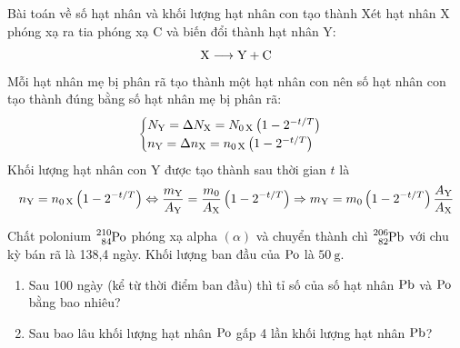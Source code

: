\begin{dang}{Bài toán về số hạt nhân và khối lượng hạt nhân con tạo thành}
		Xét hạt nhân X phóng xạ ra tia phóng xạ C và biến đổi thành hạt nhân Y:
		\begin{equation}
			\ce{X}\longrightarrow \ce{Y}+\ce{C}
		\end{equation}
		Mỗi hạt nhân mẹ bị phân rã tạo thành một hạt nhân con nên số hạt nhân con tạo thành đúng bằng số hạt nhân mẹ bị phân rã:
		\begin{equation}
			\begin{cases}
				N_{\ce{Y}}=\Delta N_{\ce{X}}=N_{\ce{0X}}\left(1-2^{-t/T}\right)\\
				n_{\ce{Y}}=\Delta n_{\ce{X}}=n_{\ce{0X}}\left(1-2^{-t/T}\right)
			\end{cases}
		\end{equation}
		Khối lượng hạt nhân con Y được tạo thành sau thời gian $t$ là
		\begin{equation}
			n_{\ce{Y}}=n_{\ce{0X}}\left(1-2^{-t/T}\right)\Leftrightarrow \dfrac{m_{\ce{Y}}}{A_{\ce{Y}}}=\dfrac{m_0}{A_{\ce{X}}}\left(1-2^{-t/T}\right)\Rightarrow m_{\ce{Y}}=m_0\left(1-2^{-t/T}\right)\dfrac{A_{\ce{Y}}}{A_{\ce{X}}}
		\end{equation}
\end{dang}
\begin{vd}
	Chất polonium $\ce{^{210}_{84}Po}$ phóng xạ alpha $\left(\alpha\right)$ và chuyển thành chì $\ce{^{206}_{82}Pb}$ với chu kỳ bán rã là 138,4 ngày. Khối lượng ban đầu của $\ce{Po}$ là $\SI{50}{\gram}$.
	\begin{enumerate}[label=\alph*)]
		\item Sau 100 ngày (kể từ thời điểm ban đầu) thì tỉ số của số hạt nhân $\ce{Pb}$ và $\ce{Po}$ bằng bao nhiêu?
		\item Sau bao lâu khối lượng hạt nhân $\ce{Po}$ gấp 4 lần khối lượng hạt nhân $\ce{Pb}$?
	\end{enumerate}
\end{vd}

